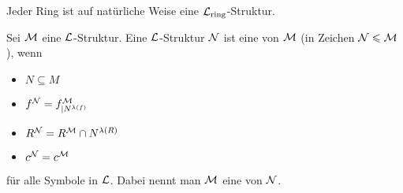 \begin{*remark}
\end{*remark}
\begin{example}
	Jeder Ring ist auf natürliche Weise eine $\mathcal L_{\operatorname{ring}}$-Struktur.
\end{example}
\begin{definition}[Unterstruktur]
	Sei $\mathcal M$ eine $\mathcal L$-Struktur. Eine $\mathcal L$-Struktur $\mathcal N$ ist eine  von $\mathcal M$ (in Zeichen $\mathcal N \leqslant \mathcal M$), wenn
	\begin{itemize}
		\item $N \subseteq M$
		\item $f^{\mathcal N} = f^{\mathcal M}_{\mid N^{\lambda(f)}}$ $\qquad$
		\item $R^{\mathcal N} = R^{\mathcal M} \cap N^{\lambda(R)}$
		\item $c^{\mathcal N} = c^{\mathcal M}$
	\end{itemize}
für alle Symbole in $\mathcal L$. Dabei nennt man $\mathcal M$ eine  von $\mathcal N$.
\end{definition}
